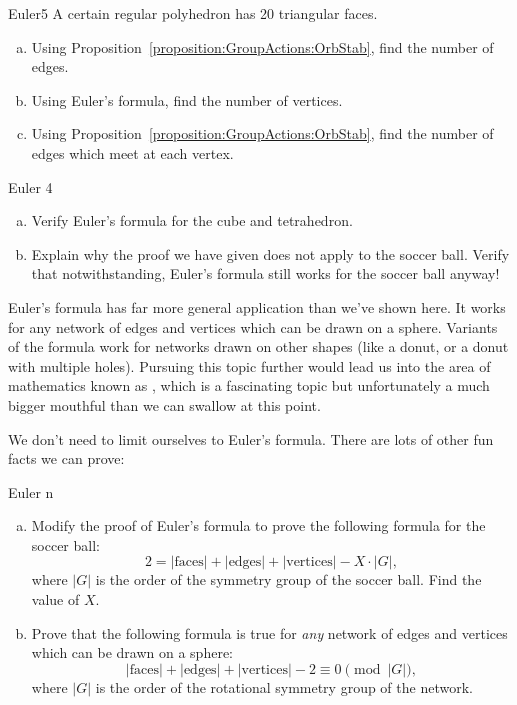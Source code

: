 \begin{exercise}{Euler5}
A certain regular polyhedron has 20 triangular faces. 
\begin{enumerate}[(a)]
\item
Using Proposition~\ref{proposition:GroupActions:OrbStab}, find the number of edges.
\item
Using Euler's formula, find the number of vertices.
\item
Using Proposition~\ref{proposition:GroupActions:OrbStab}, find the number of edges which meet at each vertex.
\end{enumerate}
\end {exercise}

\begin{exercise}{Euler 4}
\begin{enumerate}[(a)]
\item Verify Euler's formula for the cube and tetrahedron.
\item Explain why the proof we have given does not apply to the soccer ball. Verify that notwithstanding, Euler's formula still works for the soccer ball anyway! 
\end{enumerate}
\end {exercise}

\begin{rem}
 Euler's formula has far more general application than we've shown here. It works for any network of edges and vertices which can be drawn on a sphere. Variants of the formula work for networks drawn on other shapes (like a donut, or a donut with multiple holes).  Pursuing this topic further would lead us into the area  of mathematics known as , which is a fascinating topic but unfortunately a much bigger mouthful than we can swallow at this point. 
\end{rem}

We don't need to limit ourselves to Euler's formula.  There are lots of other fun facts we can prove:

\begin{exercise}{Euler n}
\begin{enumerate}[(a)]
\item Modify the proof of Euler's formula to prove the following formula for the soccer ball:
\[2 =  |\text{faces}| + |\text{edges}| + |\text{vertices}| - X \cdot |G|,\]
where $|G|$ is the order of the symmetry group of the soccer ball.  Find the value of $X$.
\item 
Prove that the following formula is true for \emph{any} network of edges and vertices which can be drawn on a sphere:
\[ |\text{faces}| + |\text{edges}| + |\text{vertices}| -2 \equiv 0 \pmod{|G|},\]
where $|G|$ is the order of the rotational symmetry group of the network.
\end{enumerate}
\end{exercise}


